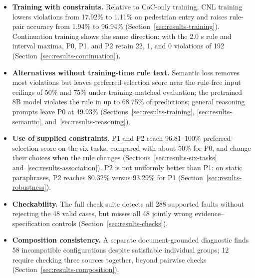 \begin{itemize}
\item \textbf{Training with constraints.} Relative to CoC-only training, CNL
training lowers violations from 17.92\% to 1.11\% on pedestrian entry and
raises rule-pair accuracy from 1.94\% to 96.94\%
(Section~\ref{sec:results-training}). Continuation training shows the same
direction: with the 2.0 s rule and interval maxima, P0, P1, and P2 retain 22,
1, and 0 violations of 192 (Section~\ref{sec:results-continuation}).
\item \textbf{Alternatives without training-time rule text.} Semantic loss
removes most violations but leaves preferred-selection score near the rule-free
input ceilings of 50\% and 75\% under training-matched evaluation; the pretrained 8B model violates the rule in up to 68.75\% of
predictions; general reasoning prompts leave P0 at 49.93\%
(Sections~\ref{sec:results-training}, \ref{sec:results-semantic},
and~\ref{sec:results-reasoning}).
\item \textbf{Use of supplied constraints.} P1 and P2 reach
96.81--100\% preferred-selection score on the six tasks, compared with about 50\% for P0,
and change their choices when the rule changes
(Sections~\ref{sec:results-six-tasks} and~\ref{sec:results-association}). P2 is
not uniformly better than P1: on static paraphrases, P2 reaches 80.32\% versus
93.29\% for P1 (Section~\ref{sec:results-robustness}).
\item \textbf{Checkability.} The full check suite detects all 288 supported
faults without rejecting the 48 valid cases, but misses all 48 jointly wrong
evidence--specification controls (Section~\ref{sec:results-checks}).
\item \textbf{Composition consistency.} A separate document-grounded diagnostic finds
58 incompatible configurations despite satisfiable individual groups;
12 require checking three sources together, beyond pairwise checks
(Section~\ref{sec:results-composition}).
\end{itemize}

